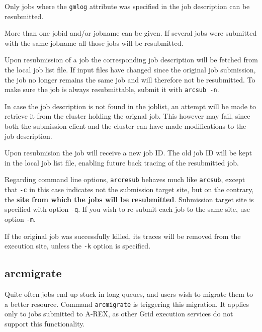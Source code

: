 \begin{framed}
   Only jobs where the \verb#gmlog# attribute was
   specified in the job description can be resubmitted.
\end{framed}

More  than  one  jobid and/or jobname can be given. If several 
jobs were submitted with the same jobname all those jobs will be resubmitted.

Upon resubmission of a job the corresponding job description will be 
fetched from the local job list file. If input files have changed since the
original job submission, the job no longer remains the same job
and will therefore not be resubmitted. To make sure the job is always resubmittable,
submit it with \verb#arcsub -n#.

In case the job description is not found in the joblist, an attempt will be made to
retrieve it from the cluster holding the orignal job.  This however
may fail, since both the submission client and
the cluster can have made modifications to the job description.

Upon resubmision the job will receive a new job ID. The old job ID will be kept
in the local job list file, enabling future back tracing of the resubmitted job.

Regarding command line options, \verb#arcresub# behaves much like \verb#arcsub#, except that
\verb#-c# in this case indicates not the submission target site, but on the contrary, the \textbf{site 
from which the jobs will be resubmitted}. Submission target site is specified with
option \verb#-q#. If you wish to re-submit each job to the same site, use option \verb#-m#.

If the original job was successfully killed, its traces will be removed from the execution site,
unless the \verb#-k# option is specified.


\subsection{arcmigrate}
\label{sec:arcmigrate}

Quite often jobs end up stuck in long queues, and users wish to migrate them to a better
resource. Command \texttt{arcmigrate} is
triggering this migration. It applies only to jobs submitted to A-REX, as other Grid
execution services do not support this functionality.

